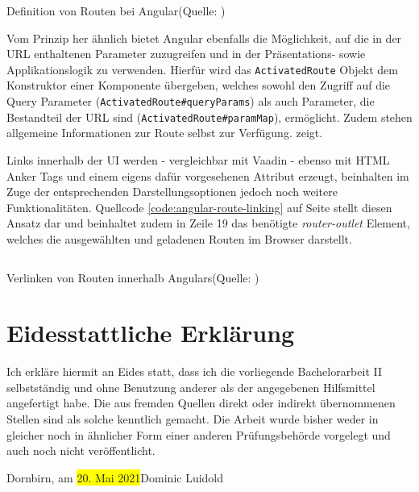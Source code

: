 \documentclass[a4paper,12pt,twoside]{scrreprt}
\begin{document}
\begin{listing}[ht]
    \inputminted[fontsize=\footnotesize,linenos]{js}{code/Angular_routes_definition.js}
    \caption[Definition von Routen bei Angular]{Definition von Routen bei Angular\newline(Quelle: \cite[][]{google_llc_angular_nodate})}
    \label{code:angular-route-definition}
\end{listing}

Vom Prinzip her ähnlich bietet Angular ebenfalls die Möglichkeit, auf die in der URL enthaltenen Parameter zuzugreifen und in der Präsentations- sowie Applikationslogik zu verwenden. Hierfür wird das \texttt{ActivatedRoute} Objekt dem Konstruktor einer Komponente übergeben, welches sowohl den Zugriff auf die Query Parameter (\texttt{ActivatedRoute\#queryParams}) als auch Parameter, die Bestandteil der URL sind (\texttt{ActivatedRoute\#paramMap}), ermöglicht. Zudem stehen allgemeine Informationen zur Route selbst zur Verfügung. \pageref{code:angular-route-definition} zeigt. \parencite[][]{google_llc_angular_nodate}

\medskip

Links innerhalb der \acs{UI} werden - vergleichbar mit Vaadin - ebenso mit HTML Anker Tags und einem eigens dafür vorgesehenen Attribut erzeugt, beinhalten im Zuge der entsprechenden Darstellungsoptionen jedoch noch weitere Funktionalitäten. Quellcode \ref{code:angular-route-linking} auf Seite \pageref{code:angular-route-linking} stellt diesen Ansatz dar und beinhaltet zudem in Zeile 19 das benötigte \textit{router-outlet} Element, welches die ausgewählten und geladenen Routen im Browser darstellt. \parencite[][]{google_llc_angular_nodate}

\begin{listing}[ht]
    \inputminted[fontsize=\footnotesize,linenos]{html}{code/Angular_anker_tags_routing.html}
    \caption[Verlinken von Routen innerhalb Angulars]{Verlinken von Routen innerhalb Angulars\newline(Quelle: \cite[][]{google_llc_angular_nodate})}
    \label{code:angular-route-linking}
\end{listing}

\clearpage
{}
{}
\printbibliography

\chapter*{Eidesstattliche Erklärung}
Ich erkläre hiermit an Eides statt, dass ich die vorliegende Bachelorarbeit II selbstständig und ohne Benutzung anderer als der angegebenen Hilfsmittel angefertigt habe. Die aus fremden Quellen direkt oder indirekt übernommenen Stellen sind als solche kenntlich gemacht. Die Arbeit wurde bisher weder in gleicher noch in ähnlicher Form einer anderen Prüfungsbehörde vorgelegt und auch noch nicht veröffentlicht.

\vspace{5cm}
\noindent
Dornbirn, am \colorbox{yellow}{20. Mai 2021}\hfill Dominic Luidold
\end{document}
